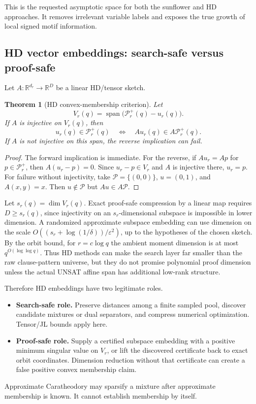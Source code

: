 \documentclass[11pt]{article}
\newtheorem{theorem}{Theorem}
\begin{document}
This is the requested asymptotic space for both the sunflower and HD approaches. It removes irrelevant variable labels and exposes the true growth of local signed motif information.

\subsection{HD vector embeddings: search-safe versus proof-safe}
Let $A:\mathbb R^{d_r}\to\mathbb R^D$ be a linear HD/tensor sketch.

\begin{theorem}[HD convex-membership criterion]
Let
\[
V_r(q)=\operatorname{span}\bigl(\mathcal P_r^+(q)-u_r(q)\bigr).
\]
If $A$ is injective on $V_r(q)$, then
\[
u_r(q)\in\mathcal P_r^+(q)
\quad\Longleftrightarrow\quad
A u_r(q)\in A\mathcal P_r^+(q).
\]
If $A$ is not injective on this span, the reverse implication can fail.
\end{theorem}
\begin{proof}
The forward implication is immediate. For the reverse, if $Au_r=A p$ for $p\in\mathcal P_r^+$, then $A(u_r-p)=0$. Since $u_r-p\in V_r$ and $A$ is injective there, $u_r=p$. For failure without injectivity, take $\mathcal P=\{(0,0)\}$, $u=(0,1)$, and $A(x,y)=x$. Then $u\notin\mathcal P$ but $Au\in A\mathcal P$.
\end{proof}

Let $s_r(q)=\dim V_r(q)$. Exact proof-safe compression by a linear map requires $D\ge s_r(q)$, since injectivity on an $s_r$-dimensional subspace is impossible in lower dimension. A randomized approximate subspace embedding can use dimension on the scale $O((s_r+\log(1/\delta))/\varepsilon^2)$, up to the hypotheses of the chosen sketch. By the orbit bound, for $r=c\log q$ the ambient moment dimension is at most $q^{O(\log\log q)}$. Thus HD methods can make the search layer far smaller than the raw clause-pattern universe, but they do not promise polynomial proof dimension unless the actual UNSAT affine span has additional low-rank structure.

Therefore HD embeddings have two legitimate roles.
\begin{itemize}
\item[] \textbf{Search-safe role.} Preserve distances among a finite sampled pool, discover candidate mixtures or dual separators, and compress numerical optimization. Tensor/JL bounds apply here.
\item[] \textbf{Proof-safe role.} Supply a certified subspace embedding with a positive minimum singular value on $V_r$, or lift the discovered certificate back to exact orbit coordinates. Dimension reduction without that certificate can create a false positive convex membership claim.
\end{itemize}
Approximate Caratheodory may sparsify a mixture after approximate membership is known. It cannot establish membership by itself.
\end{document}
